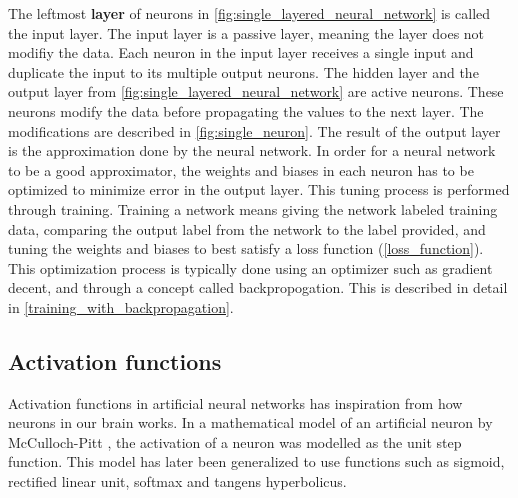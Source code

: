 The leftmost \textbf{\gls{layer}} of neurons in \ref{fig:single_layered_neural_network} is called the input layer. The input layer is a passive layer, meaning the layer does not modifiy the data. Each neuron in the input layer receives a single input and duplicate the input to its multiple output neurons. The hidden layer and the output layer from \ref{fig:single_layered_neural_network} are active neurons. These neurons modify the data before propagating the values to the next layer. The modifications are described in \ref{fig:single_neuron}. The result of the output layer is the approximation done by the neural network. \parencite{smith_scientist_1997} 
In order for a neural network to be a good approximator, the weights and biases in each neuron has to be optimized to minimize error in the output layer. This tuning process is performed through training. Training a network means giving the network labeled training data, comparing the output label from the network to the label provided, and tuning the weights and biases to best satisfy a loss function (\ref{loss_function}). This optimization process is typically done using an optimizer such as gradient decent, and through a concept called backpropogation. This is described in detail in \ref{training_with_backpropagation}.
% 

\subsection{Activation functions}
\label{activation_functions}


Activation functions in artificial neural networks has inspiration from how neurons in our brain works. In a mathematical model of an artificial neuron by McCulloch-Pitt \cite{mcculloch_logical_1943}, the activation of a neuron was modelled as the unit step function. This model has later been generalized to use functions such as sigmoid, rectified linear unit, softmax and tangens hyperbolicus. \parencite{jain_artificial_1996}


